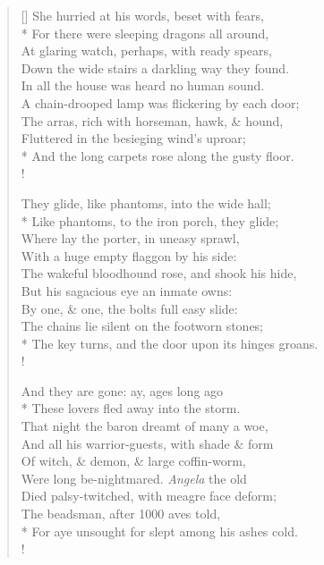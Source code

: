 \documentclass[MAIN]{subfiles}
\begin{document}
\begin{verse}[\versewidth]
\vin She hurried at his words, beset with fears,\\*
\vin For there were sleeping dragons all around,\\
\vin At glaring watch, perhaps, with ready spears,\\
\vin Down the wide stairs a darkling way they found.\\
\vin In all the house was heard no human sound.\\
\vin A chain-drooped lamp was flickering by each door;\\
\vin The arras, rich with horseman, hawk, \& hound,\\
\vin Fluttered in the besieging wind's uproar;\\*
And the long carpets rose along the gusty floor.\\!

\vin They glide, like phantoms, into the wide hall;\\*
\vin Like phantoms, to the iron porch, they glide;\\
\vin Where lay the porter, in uneasy sprawl,\\
\vin With a huge empty flaggon by his side:\\
\vin The wakeful bloodhound rose, and shook his hide,\\
\vin But his sagacious eye an inmate owns:\\
\vin By one, \& one, the bolts full easy slide:\\
\vin The chains lie silent on the footworn stones;\\*
The key turns, and the door upon its hinges groans.\\!

\vin And they are gone: ay, ages long ago\\*
\vin These lovers fled away into the storm.\\
\vin That night the baron dreamt of many a woe,\\
\vin And all his warrior-guests, with shade \& form\\
\vin Of witch, \& demon, \& large coffin-worm,\\
\vin Were long be-nightmared. \emph{Angela} the old\\
\vin Died palsy-twitched, with meagre face deform;\\
\vin The beadsman, after 1000 {\hge ave}s told,\\*
For aye unsought for slept among his ashes cold.\\!
\end{verse}
\end{document}
